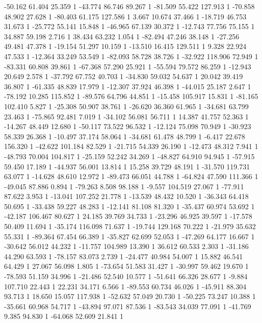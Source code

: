 	-50.162 61.404 25.359 1
	-43.774 86.746 89.267 1
	-81.509 55.422 127.913 1
	-70.858 48.902 27.628 1
	-80.403 61.175 127.586 1
	3.667 10.674 37.466 1
	-18.719 46.753 31.673 1
	-25.772 55.141 15.848 1
	-46.965 67.139 30.372 1
	-12.743 77.756 75.155 1
	34.887 59.198 2.716 1
	38.434 63.232 1.054 1
	-82.494 47.246 38.148 1
	-27.256 49.481 47.378 1
	-19.154 51.297 10.159 1
	-13.510 16.415 129.511 1
	9.328 22.924 47.533 1
	-12.364 33.249 53.549 1
	-82.093 58.728 38.726 1
	-32.922 118.906 72.949 1
	-83.331 60.808 39.861 1
	-67.368 57.290 25.921 1
	-55.594 79.572 86.259 1
	-12.943 20.649 2.578 1
	-37.792 67.752 40.703 1
	-34.830 59.032 54.637 1
	20.042 39.419 36.807 1
	-61.335 48.839 17.979 1
	-12.307 37.924 46.398 1
	-44.015 25.187 2.647 1
	-78.192 10.285 115.852 1
	-89.576 64.796 44.851 1
	-15.458 105.917 15.831 1
	-81.165 102.410 5.827 1
	-25.308 50.907 38.761 1
	-26.620 36.360 61.965 1
	-34.681 63.799 23.463 1
	-75.865 92.481 7.019 1
	-34.102 56.081 56.711 1
	14.387 41.757 52.363 1
	-14.267 48.449 12.680 1
	-50.117 73.522 96.532 1
	-12.124 75.098 70.949 1
	-30.923 58.339 26.368 1
	-10.497 37.174 58.064 1
	-34.681 61.478 48.799 1
	-6.417 22.678 156.320 1
	-42.622 101.184 82.529 1
	-21.715 54.339 26.190 1
	-12.473 48.312 7.941 1
	-48.793 70.004 104.817 1
	-25.159 52.242 34.269 1
	-48.827 64.910 94.945 1
	-57.915 59.450 17.189 1
	-44.937 56.001 13.814 1
	15.258 39.729 48.191 1
	-31.570 119.731 63.077 1
	-14.628 48.610 12.972 1
	-89.473 66.051 44.788 1
	-64.824 47.590 111.366 1
	-49.045 87.886 0.894 1
	-79.263 8.508 98.188 1
	-9.557 104.519 27.067 1
	-77.911 87.622 3.953 1
	-13.041 107.252 21.778 1
	-13.539 48.432 10.520 1
	-36.343 64.418 50.695 1
	-33.438 59.227 48.283 1
	-12.141 81.108 81.320 1
	-35.437 60.974 53.692 1
	-42.187 106.467 80.627 1
	24.185 39.769 34.733 1
	-23.296 46.925 39.597 1
	-17.578 50.409 11.694 1
	-35.174 116.098 71.637 1
	-19.744 129.168 70.222 1
	-21.979 35.632 55.331 1
	-89.364 67.454 66.389 1
	-35.827 62.699 52.053 1
	-47.269 64.177 16.667 1
	-30.642 56.012 44.232 1
	-11.757 104.989 13.390 1
	36.612 60.533 2.303 1
	-31.186 44.290 63.593 1
	-78.157 83.073 2.739 1
	-24.477 40.984 54.007 1
	15.882 46.541 64.429 1
	27.067 56.098 1.805 1
	-73.654 51.583 31.427 1
	-30.997 59.462 19.670 1
	-78.593 51.159 34.996 1
	-21.486 52.540 10.577 1
	-51.641 66.326 28.677 1
	-9.884 107.710 22.443 1
	22.231 34.171 6.566 1
	-89.553 60.734 46.026 1
	-45.911 88.304 93.713 1
	18.650 15.057 117.938 1
	-52.632 57.049 20.730 1
	-50.225 73.247 10.388 1
	-35.661 60.968 54.717 1
	-43.894 97.071 87.536 1
	-83.543 34.039 77.091 1
	-41.769 9.385 94.830 1
	-64.068 52.609 21.841 1
